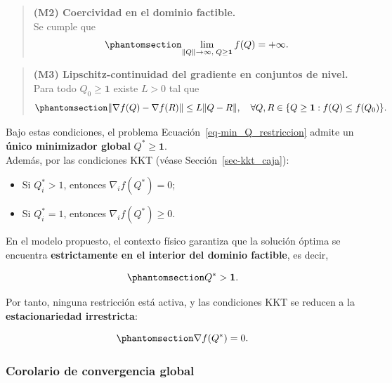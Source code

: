 \documentclass[
  spanish,
  us-letterpaper,
]{scrreprt}
\providecommand{\tightlist}{%
  \setlength{\itemsep}{0pt}\setlength{\parskip}{0pt}}
\numberwithin{equation}{section}
\begin{document}
\begin{quote}
\textbf{(M2) Coercividad en el dominio factible.}\\
Se cumple que \begin{equation}\phantomsection\label{eq-77}{
\lim_{\|Q\| \to \infty,\; Q \ge \mathbf{1}} f(Q) = +\infty. 
}\end{equation}
\end{quote}

\begin{quote}
\textbf{(M3) Lipschitz-continuidad del gradiente en conjuntos de
nivel.}\\
Para todo \(Q_0 \ge \mathbf{1}\) existe \(L > 0\) tal que
\begin{equation}\phantomsection\label{eq-78}{
\|\nabla f(Q) - \nabla f(R)\| \le L \|Q - R\|, \quad
\forall Q,R \in \{Q \ge \mathbf{1} : f(Q) \le f(Q_0)\}. 
}\end{equation}
\end{quote}

Bajo estas condiciones, el problema Ecuación~\ref{eq-min_Q_restriccion}
admite un \textbf{único minimizador global} \(Q^* \ge \mathbf{1}\).\\
Además, por las condiciones KKT (véase Sección~\ref{sec-kkt_caja}):

\begin{itemize}
\tightlist
\item
  Si \(Q_i^* > 1\), entonces \(\nabla_i f(Q^*) = 0\);\\
\item
  Si \(Q_i^* = 1\), entonces \(\nabla_i f(Q^*) \ge 0\).
\end{itemize}

En el modelo propuesto, el contexto físico garantiza que la solución
óptima se encuentra \textbf{estrictamente en el interior del dominio
factible}, es decir,

\begin{equation}\phantomsection\label{eq-79}{
Q^* > \mathbf{1}.
}\end{equation}

Por tanto, ninguna restricción está activa, y las condiciones KKT se
reducen a la \textbf{estacionariedad irrestricta}:

\begin{equation}\phantomsection\label{eq-80}{
\nabla f(Q^*) = 0. 
}\end{equation}

\subsubsection{Corolario de convergencia
global}\label{corolario-de-convergencia-global}
\end{document}
